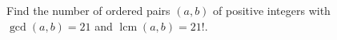 Find the number of ordered pairs $(a,b)$ of positive integers with $\gcd(a,b)=21$ and $\operatorname{lcm}(a,b)=21!$.
